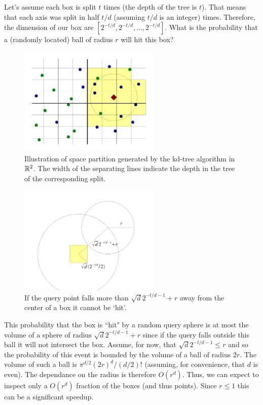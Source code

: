 \documentclass{article}
\begin{document}
Let's assume each box is split $t$ times (the depth of the tree is $t$). 
That means that each axis was split in half $t/d$ (assuming $t/d$ is an integer) times.
Therefore, the dimension of our box are $[2^{-t/d},2^{-t/d},\ldots,2^{-t/d}]$.
What is the probability that a (randomly located) ball of radius $r$ will hit this box?

\begin{figure}[h!]
  \centering
  \includegraphics[width=0.6\textwidth]{11_images/nns_simple.pdf}
  \caption{Illustration of space partition generated by the kd-tree algorithm in ${\mathbb{R}}^2$. 
  The width of the separating lines indicate the depth in the tree of the corresponding split.}
\end{figure}


\begin{figure}[h!]
  \centering
  \includegraphics[width=0.6\textwidth]{11_images/radii.pdf}
  \caption{If the query point falls more than $\sqrt{d}2^{-t/d-1} + r$ away from the center of a 
  box it cannot be `hit'.}
\end{figure}

This probability that the box is ``hit" by a random query sphere 
is at most the volume of a sphere of radius $\sqrt{d}2^{-t/d-1} + r$ since 
if the query falls outside this ball it will not intersect the box. Assume, for now, that $\sqrt{d}2^{-t/d-1} \le r$ and
so the probability of this event is bounded by the volume of a ball of radius $2r$.
The volume of such a ball is $\pi^{d/2}(2r)^d/(d/2)!$ (assuming, for convenience, that $d$ is even).
The dependance on the radius is therefore $O(r^d)$. Thus, we can expect to inspect only a $O(r^d)$ fraction of the 
boxes (and thus points). Since $r\le 1$ this can be a significant speedup.
\end{document}
